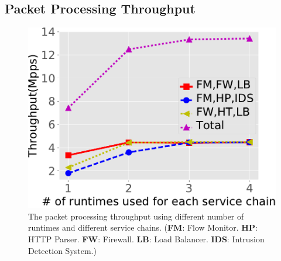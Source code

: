 

\subsection{Packet Processing Throughput}
\label{sec:ppc}

\begin{figure}[!t]
	\centering
	\includegraphics[width=\columnwidth]{figure/revised-throughput-test.pdf}
	\caption{The packet processing throughput using different number of runtimes and different service chains.
  (\textbf{FM}: Flow Monitor. \textbf{HP}: HTTP Parser. \textbf{FW}: Firewall. \textbf{LB}: Load Balancer. \textbf{IDS}: Intrusion Detection System.)}
\label{fig:normal-case-eval}
\end{figure}


